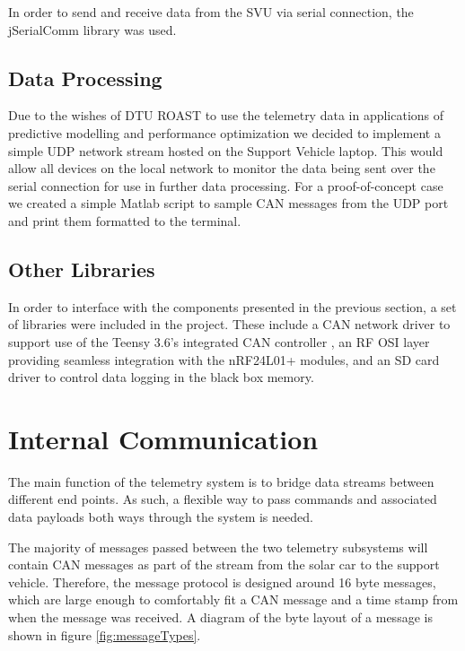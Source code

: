 \documentclass[conference]{IEEEtran}
\begin{document}
In order to send and receive data from the SVU via serial connection, the jSerialComm \cite{jSerialComm} library was used.

\subsection{Data Processing} %
Due to the wishes of DTU ROAST to use the telemetry data in applications of predictive modelling and performance optimization we decided to implement a simple UDP network stream hosted on the Support Vehicle laptop. This would allow all devices on the local network to monitor the data being sent over the serial connection for use in further data processing. For a proof-of-concept case we created a simple Matlab script to sample CAN messages from the UDP port and print them formatted to the terminal. 

\subsection{Other Libraries}
In order to interface with the components presented in the previous section, a set of libraries were included in the project. These include a CAN network driver to support use of the Teensy 3.6's integrated CAN controller \cite{ACAN}, an RF OSI layer providing seamless integration with the nRF24L01+ modules, and an SD card driver to control data logging in the black box memory. 



\section{Internal Communication}
The main function of the telemetry system is to bridge data streams between different end points. As such, a flexible way to pass commands and associated data payloads both ways through the system is needed. 

The majority of messages passed between the two telemetry subsystems will contain CAN messages as part of the stream from the solar car to the support vehicle. Therefore, the message protocol is designed around 16 byte messages, which are large enough to comfortably fit a CAN message and a time stamp from when the message was received. A diagram of the byte layout of a message is shown in figure \ref{fig:messageTypes}.
\end{document}
